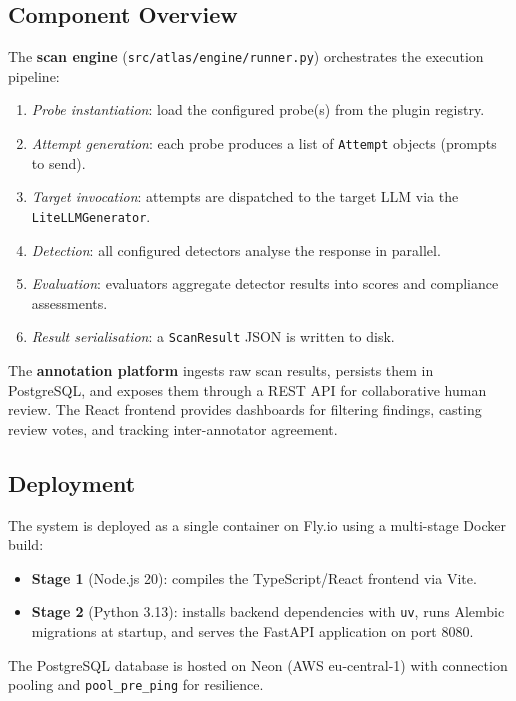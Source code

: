 \documentclass[12pt,a4paper]{report}
\begin{document}
\subsection{Component Overview}

The \textbf{scan engine} (\texttt{src/atlas/engine/runner.py}) orchestrates the execution pipeline:
\begin{enumerate}
    \item \textit{Probe instantiation}: load the configured probe(s) from the plugin registry.
    \item \textit{Attempt generation}: each probe produces a list of \texttt{Attempt} objects (prompts to send).
    \item \textit{Target invocation}: attempts are dispatched to the target LLM via the \texttt{LiteLLMGenerator}.
    \item \textit{Detection}: all configured detectors analyse the response in parallel.
    \item \textit{Evaluation}: evaluators aggregate detector results into scores and compliance assessments.
    \item \textit{Result serialisation}: a \texttt{ScanResult} JSON is written to disk.
\end{enumerate}

The \textbf{annotation platform} ingests raw scan results, persists them in PostgreSQL, and exposes them through a REST API for collaborative human review. The React frontend provides dashboards for filtering findings, casting review votes, and tracking inter-annotator agreement.

\subsection{Deployment}

The system is deployed as a single container on Fly.io using a multi-stage Docker build:
\begin{itemize}
    \item \textbf{Stage 1} (Node.js 20): compiles the TypeScript/React frontend via Vite.
    \item \textbf{Stage 2} (Python 3.13): installs backend dependencies with \texttt{uv}, runs Alembic migrations at startup, and serves the FastAPI application on port 8080.
\end{itemize}
The PostgreSQL database is hosted on Neon (AWS eu-central-1) with connection pooling and \texttt{pool\_pre\_ping} for resilience.

\end{document}
